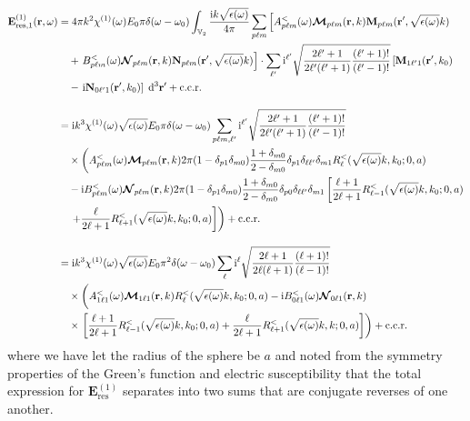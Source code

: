 \documentclass{article}
\begin{document}
\begin{equation}
\begin{split}
\mathbf{E}_\mathrm{res,1}^{(1)}(\mathbf{r},\omega) &= 4\pi k^2\chi^{(1)}(\omega)E_0\pi\delta(\omega - \omega_0)\int_{\mathbb{V}_2}\frac{\mathrm{i}k\sqrt{\epsilon(\omega)}}{4\pi}\sum_{p\ell m}\left[A_{p\ell m}^<(\omega)\bm{\mathcal{M}}_{p\ell m}(\mathbf{r},k)\mathbf{M}_{p\ell m}(\mathbf{r}',\sqrt{\epsilon(\omega)}k)\right.\\
&\quad+\left.B_{p\ell m}^<(\omega)\bm{\mathcal{N}}_{p\ell m}(\mathbf{r},k)\mathbf{N}_{p\ell m}(\mathbf{r}',\sqrt{\epsilon(\omega)}k)\right]\cdot\sum_{\ell'}\mathrm{i}^{\ell'}\sqrt{\frac{2\ell'+1}{2\ell'(\ell'+1)}\frac{(\ell'+1)!}{(\ell'-1)!}}\left[\mathbf{M}_{1\ell'1}(\mathbf{r}',k_0)\right.\\
&\quad-\left.\mathrm{i}\mathbf{N}_{0\ell'1}(\mathbf{r}',k_0)\right]\;\mathrm{d}^3\mathbf{r}' + \mathrm{c.c.r.}\\[1.0em]
&=\mathrm{i}k^3\chi^{(1)}(\omega)\sqrt{\epsilon(\omega)}E_0\pi\delta(\omega - \omega_0)\sum_{p\ell m,\ell'}\mathrm{i}^{\ell'}\sqrt{\frac{2\ell'+1}{2\ell'(\ell'+1)}\frac{(\ell'+1)!}{(\ell'-1)!}}\\
&\quad\times\left(A_{p\ell m}^<(\omega)\bm{\mathcal{M}}_{p\ell m}(\mathbf{r},k)2\pi(1 - \delta_{p1}\delta_{m0})\frac{1 + \delta_{m0}}{2 - \delta_{m0}}\delta_{p1}\delta_{\ell\ell'}\delta_{m1}R_\ell^<(\sqrt{\epsilon(\omega)}k,k_0;0,a)\right.\\
&\quad-\mathrm{i}B_{p\ell m}^<(\omega)\bm{\mathcal{N}}_{p\ell m}(\mathbf{r},k)2\pi(1 - \delta_{p1}\delta_{m0})\frac{1 + \delta_{m0}}{2 - \delta_{m0}}\delta_{p0}\delta_{\ell\ell'}\delta_{m1}\left[\frac{\ell + 1}{2\ell + 1}R^<_{\ell - 1}(\sqrt{\epsilon(\omega)}k,k_0;0,a)\right.\\
&\quad\left.\left.+ \frac{\ell}{2\ell + 1}R^<_{\ell + 1}(\sqrt{\epsilon(\omega)}k,k_0;0,a)\right]\right) + \mathrm{c.c.r.}\\[1.0em]
&= \mathrm{i}k^3\chi^{(1)}(\omega)\sqrt{\epsilon(\omega)}E_0\pi^2\delta(\omega - \omega_0)\sum_\ell\mathrm{i}^{\ell}\sqrt{\frac{2\ell+1}{2\ell(\ell+1)}\frac{(\ell+1)!}{(\ell-1)!}}\\
&\quad\times\left( \vphantom{\frac{\ell + 1}{2\ell + 1}} A_{1\ell1}^<(\omega)\bm{\mathcal{M}}_{1\ell1}(\mathbf{r},k)R_\ell^<(\sqrt{\epsilon(\omega)}k,k_0;0,a) - \mathrm{i}B_{0\ell1}^<(\omega)\bm{\mathcal{N}}_{0\ell1}(\mathbf{r},k)\right.\\
&\quad\times\left.\left[\frac{\ell + 1}{2\ell + 1}R_{\ell -1}^<(\sqrt{\epsilon(\omega)}k,k_0;0,a) + \frac{\ell}{2\ell + 1}R_{\ell + 1}^<(\sqrt{\epsilon(\omega)}k,k;0,a)\right]\right) + \mathrm{c.c.r.}
\end{split}
\end{equation}
where we have let the radius of the sphere be $a$ and noted from the symmetry properties of the Green's function and electric susceptibility that the total expression for $\mathbf{E}_\mathrm{res}^{(1)}$ separates into two sums that are conjugate reverses of one another.
\end{document}

